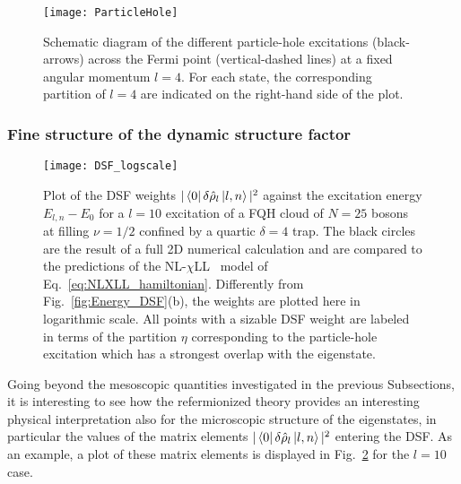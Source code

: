 \documentclass[twocolumn,pra,superscriptaddress,noshowpacs]{revtex4}
\newcommand{\nlchill}{NL-$\chi$LL }
\begin{document}
\begin{figure}[htbp]
   	\begin{adjustbox}{width=.45\textwidth, totalheight=\baselineskip,keepaspectratio,right}
      	\texttt{[image: ParticleHole]}
    \end{adjustbox}
    \vspace{0.0cm}\caption{
    Schematic diagram of the different particle-hole excitations (black-arrows) across the Fermi point (vertical-dashed lines) at a fixed angular momentum $l=4$. For each state, the corresponding partition of $l=4$ are indicated on the right-hand side of the plot.
    \label{fig:ParticleHole}}
\end{figure}

\subsubsection{Fine structure of the dynamic structure factor}\label{subsec:DSF_fine_structure}

\begin{figure}[htbp]
   	\begin{adjustbox}{width=.5\textwidth, totalheight=\baselineskip,keepaspectratio,right}
      	\texttt{[image: DSF\_logscale]}
    \end{adjustbox}
    \vspace{0.0cm}\caption{Plot of the DSF weights $|\bra{0}\delta\hat\rho_l\ket{l,n}|^2$ against the excitation energy $E_{l,n}-E_0$ for a $l=10$ excitation of a FQH cloud of $N=25$ bosons at  filling $\nu=1/2$ confined by a quartic $\delta=4$ trap. The black circles are the result of a full 2D numerical calculation and are compared to the predictions of the \nlchill~model of Eq.~\eqref{eq:NLXLL_hamiltonian}. Differently from Fig.~\ref{fig:Energy_DSF}(b), the weights are plotted here in logarithmic scale.
    All points with a sizable DSF weight are labeled in terms of the partition $\eta$ corresponding to the particle-hole excitation which has a strongest overlap with the eigenstate.
    \label{fig:DSFLogScale}}
\end{figure}

Going beyond the mesoscopic quantities investigated in the previous Subsections, it is interesting to see how the refermionized theory provides an interesting physical interpretation also for the microscopic structure of the eigenstates, in particular the values of the matrix elements $|\bra{0}\delta\hat\rho_l\ket{l,n}|^2$ entering the DSF. As an example, a plot of these matrix elements is displayed in Fig.~\ref{fig:DSFLogScale} for the $l=10$ case. 
\end{document}

